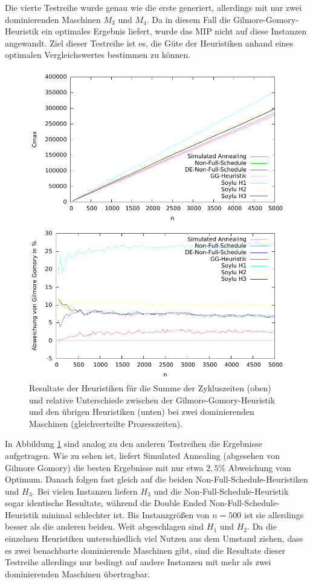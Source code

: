 \documentclass{scrreprt}
\begin{document}
Die vierte Testreihe wurde genau wie die erste generiert, allerdings mit nur zwei dominierenden Maschinen $M_3$ und $M_4$.
Da in diesem Fall die Gilmore-Gomory-Heuristik ein optimales Ergebnis liefert, wurde das MIP nicht auf diese Instanzen angewandt.
Ziel dieser Testreihe ist es, die Güte der Heuristiken anhand eines optimalen Vergleichswertes bestimmen zu können.
\begin{figure}
    \begin{center}
        \includegraphics[width=.8\textwidth]{../instances/2dom/plot.pdf}
    \end{center}
    \begin{center}
        \includegraphics[width=.8\textwidth]{../instances/2dom/plotrel.pdf}
    \end{center}
    \caption{
        \label{abb:2dom}
        Resultate der Heuristiken für die Summe der Zykluszeiten (oben) 
        und relative Unterschiede zwischen der Gilmore-Gomory-Heuristik und den übrigen Heuristiken (unten) 
        bei zwei dominierenden Maschinen (gleichverteilte Prozesszeiten).
    }
\end{figure}
In Abbildung \ref{abb:2dom} sind analog zu den anderen Testreihen die Ergebnisse aufgetragen.
Wie zu sehen ist, liefert Simulated Annealing (abgesehen von Gilmore Gomory) die besten Ergebnisse mit nur etwa $2{,}5\%$ Abweichung vom Optimum.
Danach folgen fast gleich auf die beiden Non-Full-Schedule-Heuristiken und $H_3$.
Bei vielen Instanzen liefern $H_3$ und die Non-Full-Schedule-Heuristik sogar identische Resultate, 
während die Double Ended Non-Full-Schedule-Heuristik minimal schlechter ist.
Bis Instanzgrößen von $n=500$ ist sie allerdings besser als die anderen beiden.
Weit abgeschlagen sind $H_1$ und $H_2$.
Da die einzelnen Heuristiken unterschiedlich viel Nutzen aus dem Umstand ziehen, dass es zwei benachbarte dominierende Maschinen gibt,
sind die Resultate dieser Testreihe allerdings nur bedingt auf andere Instanzen mit mehr als zwei dominierenden Maschinen übertragbar.
\end{document}
